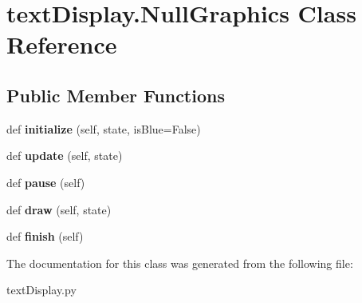 \hypertarget{classtext_display_1_1_null_graphics}{}\section{text\+Display.\+Null\+Graphics Class Reference}
\label{classtext_display_1_1_null_graphics}
\subsection*{Public Member Functions}
\begin{DoxyCompactItemize}
\item 
\mbox{\label{classtext_display_1_1_null_graphics_a15d4fa88ba93d27cf1342214e4f75473}} 
def {\bfseries initialize} (self, state, is\+Blue=False)
\item 
\mbox{\label{classtext_display_1_1_null_graphics_ab4a92614b259e35d388ea5aeed5872d6}} 
def {\bfseries update} (self, state)
\item 
\mbox{\label{classtext_display_1_1_null_graphics_a4243d7efb99c6aed25ac3017cede8666}} 
def {\bfseries pause} (self)
\item 
\mbox{\label{classtext_display_1_1_null_graphics_a4d4204bef8e5415f173d58ca4ae6a4a9}} 
def {\bfseries draw} (self, state)
\item 
\mbox{\label{classtext_display_1_1_null_graphics_a34f8876adf514cb304a3697dd128d552}} 
def {\bfseries finish} (self)
\end{DoxyCompactItemize}


The documentation for this class was generated from the following file\+:\begin{DoxyCompactItemize}
\item 
text\+Display.\+py\end{DoxyCompactItemize}
